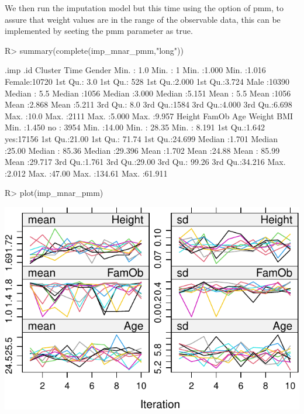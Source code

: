 \documentclass[
]{jss}
\begin{document}
We then run the imputation model but this time using the option of pmm,
to assure that weight values are in the range of the observable data,
this can be implemented by seeting the pmm parameter as true.

\begin{CodeChunk}
\begin{CodeInput}
R> summary(complete(imp_mnar_pmm,"long"))
\end{CodeInput}
\begin{CodeOutput}
      .imp           .id          Cluster           Time          Gender     
 Min.   : 1.0   Min.   :   1   Min.   :1.000   Min.   :1.016   Female:10720  
 1st Qu.: 3.0   1st Qu.: 528   1st Qu.:2.000   1st Qu.:3.724   Male  :10390  
 Median : 5.5   Median :1056   Median :3.000   Median :5.151                 
 Mean   : 5.5   Mean   :1056   Mean   :2.868   Mean   :5.211                 
 3rd Qu.: 8.0   3rd Qu.:1584   3rd Qu.:4.000   3rd Qu.:6.698                 
 Max.   :10.0   Max.   :2111   Max.   :5.000   Max.   :9.957                 
     Height      FamOb            Age            Weight            BMI        
 Min.   :1.450   no : 3954   Min.   :14.00   Min.   : 28.35   Min.   : 8.191  
 1st Qu.:1.642   yes:17156   1st Qu.:21.00   1st Qu.: 71.74   1st Qu.:24.699  
 Median :1.701               Median :25.00   Median : 85.36   Median :29.396  
 Mean   :1.702               Mean   :24.88   Mean   : 85.99   Mean   :29.717  
 3rd Qu.:1.761               3rd Qu.:29.00   3rd Qu.: 99.26   3rd Qu.:34.216  
 Max.   :2.012               Max.   :47.00   Max.   :134.61   Max.   :61.911  
\end{CodeOutput}
\begin{CodeInput}
R> plot(imp_mnar_pmm)
\end{CodeInput}


\begin{center}\includegraphics{Imputation_of_Incomplete_Multilevel_Data_files/figure-latex/obsmnarp_plot-1} \end{center}




\end{CodeChunk}
\end{document}
